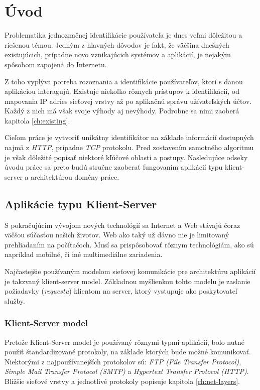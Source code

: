 \documentclass[
  digital, %
  table,   %
  lof,     %
  nolot,   %
  nocover
]{fithesis3}
\begin{document}
\chapter{Úvod}
Problematika jednoznačnej identifikácie používateľa je dnes veľmi
dôležitou a riešenou témou. Jedným z hlavných dôvodov je fakt, že väčšina
dnešných existujúcich, prípadne novo vznikajúcich systémov a aplikácií, je
nejakým spôsobom zapojená do Internetu. \nocite{article-minimal}

Z toho vyplýva potreba rozoznania a identifikácie používateľov, ktorí s
danou aplikáciou interagujú. Existuje niekoľko rôznych prístupov k 
identifikácii, od mapovania IP adries sieťovej vrstvy až po aplikačnú správu
užívateľských účtov. Každý z nich má však svoje výhody aj nevýhody. Podrobne sa nimi zaoberá kapitola \ref{ch:existing}.

Cieľom práce je vytvoriť unikátny identifikátor na základe informácií
dostupných najmä z \textit{HTTP}, prípadne \textit{TCP} protokolu. Pred zostavením samotného algoritmu je
však dôležité popísať niektoré kľúčové oblasti a postupy.
Nasledujúce odseky úvodu práce sa preto budú stručne zaoberať fungovaním aplikácií typu
klient-server a architektúrou domény práce. 

\section{Aplikácie typu Klient-Server}
S pokračujúcim vývojom nových technológií sa Internet a Web stávajú čoraz väčšou
súčasťou našich životov. Web ako taký už dávno nie je limitovaný prehliadaním na
počítačoch. Musí sa prispôsobovať rôznym technológiám, ako sú napríklad
mobilné, či iné multimediálne zariadenia.

Najčastejšie používaným modelom sieťovej komunikácie pre
architektúru aplikácií je takzvaný klient-server model. Základnou
myšlienkou tohto modelu je zaslanie požiadavky (\textit{requestu}) klientom na
server, ktorý vystupuje ako poskytovateľ služby.

\subsection{Klient-Server model}
Pretože Klient-Server model je používaný rôznymi typmi aplikácií, bolo nutné
použiť štandardizované protokoly, na základe ktorých bude možné komunikovať.
Niektorými z najpoužívanejších protokolov sú: \textit{FTP (File Transfer Protocol)},
\textit{Simple Mail Transfer Protocol (SMTP)} a \textit{Hypertext Transfer
Protocol (HTTP)}. Bližšie sieťové vrstvy a jednotlivé protokoly popisuje
kapitola \ref{ch:net-layers}.
\end{document}
